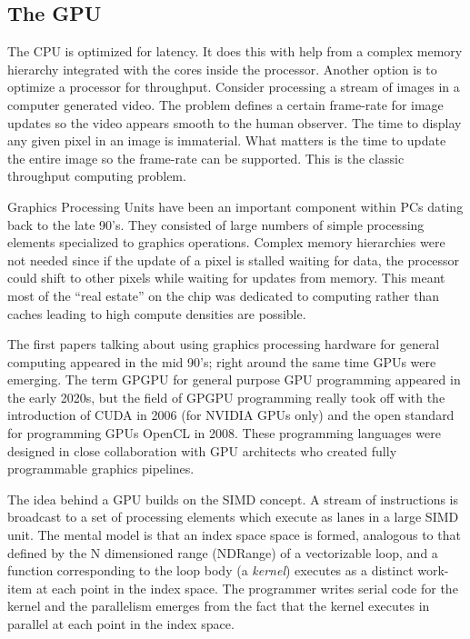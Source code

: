    
\subsection{The GPU}

The CPU is optimized for latency.   It does this with help from a complex memory hierarchy integrated with the cores
inside the processor.  Another option is to optimize a processor for throughput.  Consider processing a stream of images
in a computer generated video.   The problem defines a certain frame-rate for image updates so the video appears smooth to the human
observer.  The time to display any given pixel in an image is immaterial.  What matters is the time to update the entire
image so the frame-rate can be supported.  This is the classic throughput computing problem.  

Graphics Processing Units have been an important component within PCs dating back to the late 90's.  They consisted of large numbers of
simple processing elements specialized to graphics operations.  Complex memory hierarchies were not needed since if the
update of a pixel is stalled waiting for data, the processor could shift to other pixels while waiting for updates from memory.
This meant most of the ``real estate'' on the chip was dedicated to computing rather than caches leading to high compute densities are possible.

The first papers talking about using graphics processing hardware for general computing appeared in the mid 90's; right around the
same time GPUs were emerging.  The term GPGPU for general purpose GPU programming appeared in the early 2020s, but the
field of GPGPU programming really took off with the introduction of CUDA in 2006 (for NVIDIA GPUs only) and the open standard for 
programming GPUs OpenCL in 2008.  These programming languages were designed in close collaboration with GPU architects who
created fully programmable graphics pipelines.

The idea behind a GPU builds on the SIMD concept.  A stream of instructions is broadcast to a set of processing 
elements which execute as lanes in a large SIMD unit.  The mental model is that an index space space is formed, analogous 
to that defined by the N dimensioned range (NDRange) of a vectorizable loop, and a function corresponding 
to the loop body (a \emph{kernel}) executes as a distinct
work-item at each point in the index space.  The programmer writes serial code for the kernel and the parallelism emerges
from the fact that the kernel executes in parallel at each point in the index space.

